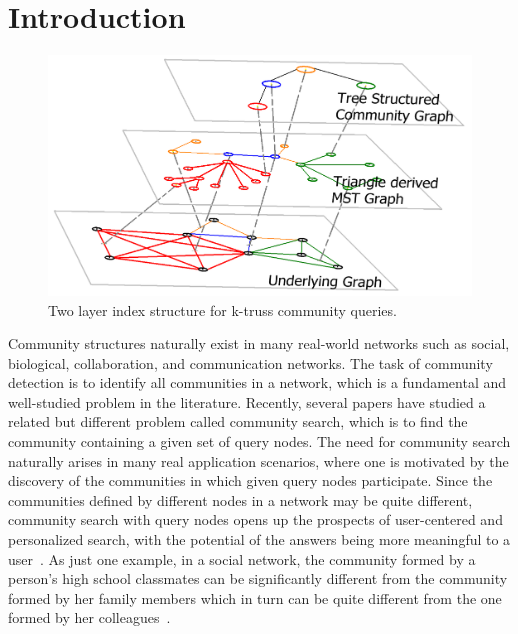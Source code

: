 \section{Introduction}
\label{introduction}

\begin{figure}[ht]
    \centering
    \includegraphics[width=\linewidth]{./figures/illustration_main.png}
    \caption{Two layer index structure for k-truss community queries.}
    \label{fig:illustration_main}
		\vspace{-0.2 in}
\end{figure}

Community structures naturally exist in many real-world networks such as social, biological, collaboration, and communication networks. The task of community detection is to identify all communities in a network, which is a fundamental and well-studied problem in the literature. Recently, several papers have studied a
related but different problem called community search, which is to find the community containing a given set of query nodes. The need for community search naturally arises in many real application scenarios, where one is motivated by the discovery of the communities in which given query nodes participate. Since the communities defined by different nodes in a network may be quite different, community search with query nodes opens up the prospects of user-centered and personalized search, with the potential of the answers being more meaningful to a user~\cite{huang2014querying}. As just one example, in a social network, the community formed by a person's high school classmates can be significantly different from the community formed by her family members which in turn can be quite different from the one formed by her colleagues~\cite{mcauley2012learning}.

